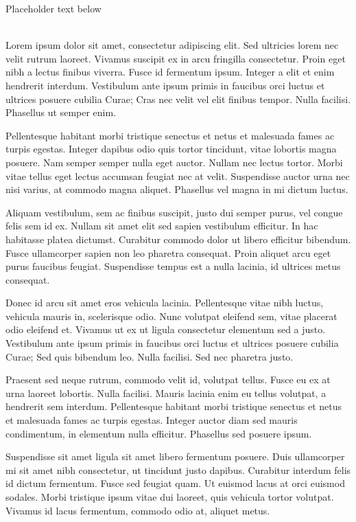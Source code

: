 Placeholder text below\\

\\

Lorem ipsum dolor sit amet, consectetur adipiscing elit. Sed ultricies lorem nec velit rutrum laoreet. Vivamus suscipit ex in arcu fringilla consectetur. Proin eget nibh a lectus finibus viverra. Fusce id fermentum ipsum. Integer a elit et enim hendrerit interdum. Vestibulum ante ipsum primis in faucibus orci luctus et ultrices posuere cubilia Curae; Cras nec velit vel elit finibus tempor. Nulla facilisi. Phasellus ut semper enim.

Pellentesque habitant morbi tristique senectus et netus et malesuada fames ac turpis egestas. Integer dapibus odio quis tortor tincidunt, vitae lobortis magna posuere. Nam semper semper nulla eget auctor. Nullam nec lectus tortor. Morbi vitae tellus eget lectus accumsan feugiat nec at velit. Suspendisse auctor urna nec nisi varius, at commodo magna aliquet. Phasellus vel magna in mi dictum luctus.

Aliquam vestibulum, sem ac finibus suscipit, justo dui semper purus, vel congue felis sem id ex. Nullam sit amet elit sed sapien vestibulum efficitur. In hac habitasse platea dictumst. Curabitur commodo dolor ut libero efficitur bibendum. Fusce ullamcorper sapien non leo pharetra consequat. Proin aliquet arcu eget purus faucibus feugiat. Suspendisse tempus est a nulla lacinia, id ultrices metus consequat.

Donec id arcu sit amet eros vehicula lacinia. Pellentesque vitae nibh luctus, vehicula mauris in, scelerisque odio. Nunc volutpat eleifend sem, vitae placerat odio eleifend et. Vivamus ut ex ut ligula consectetur elementum sed a justo. Vestibulum ante ipsum primis in faucibus orci luctus et ultrices posuere cubilia Curae; Sed quis bibendum leo. Nulla facilisi. Sed nec pharetra justo.

Praesent sed neque rutrum, commodo velit id, volutpat tellus. Fusce eu ex at urna laoreet lobortis. Nulla facilisi. Mauris lacinia enim eu tellus volutpat, a hendrerit sem interdum. Pellentesque habitant morbi tristique senectus et netus et malesuada fames ac turpis egestas. Integer auctor diam sed mauris condimentum, in elementum nulla efficitur. Phasellus sed posuere ipsum.

Suspendisse sit amet ligula sit amet libero fermentum posuere. Duis ullamcorper mi sit amet nibh consectetur, ut tincidunt justo dapibus. Curabitur interdum felis id dictum fermentum. Fusce sed feugiat quam. Ut euismod lacus at orci euismod sodales. Morbi tristique ipsum vitae dui laoreet, quis vehicula tortor volutpat. Vivamus id lacus fermentum, commodo odio at, aliquet metus.

